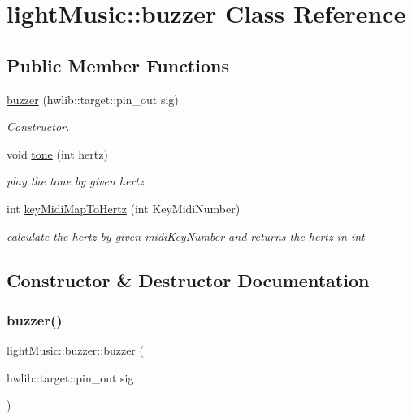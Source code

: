 \hypertarget{classlight_music_1_1buzzer}{}\section{light\+Music\+:\+:buzzer Class Reference}
\label{classlight_music_1_1buzzer}
\subsection*{Public Member Functions}
\begin{DoxyCompactItemize}
\item 
\hyperlink{classlight_music_1_1buzzer_aa708682093bf3831c1d54e75ef21eb63}{buzzer} (hwlib\+::target\+::pin\+\_\+out sig)
\begin{DoxyCompactList}\small\item\em Constructor. \end{DoxyCompactList}\item 
void \hyperlink{classlight_music_1_1buzzer_a5fed541127d6e863a4981b79388ab1bb}{tone} (int hertz)
\begin{DoxyCompactList}\small\item\em play the tone by given hertz \end{DoxyCompactList}\item 
int \hyperlink{classlight_music_1_1buzzer_a51b71d6a57ac66340e67f641fb3d3a69}{key\+Midi\+Map\+To\+Hertz} (int Key\+Midi\+Number)
\begin{DoxyCompactList}\small\item\em calculate the hertz by given midi\+Key\+Number and returns the hertz in int \end{DoxyCompactList}\end{DoxyCompactItemize}


\subsection{Constructor \& Destructor Documentation}
\mbox{\label{classlight_music_1_1buzzer_aa708682093bf3831c1d54e75ef21eb63}} 
\subsubsection{\texorpdfstring{buzzer()}{buzzer()}}
{\footnotesize\ttfamily light\+Music\+::buzzer\+::buzzer (\begin{DoxyParamCaption}\item[{hwlib\+::target\+::pin\+\_\+out}]{sig }\end{DoxyParamCaption})}



